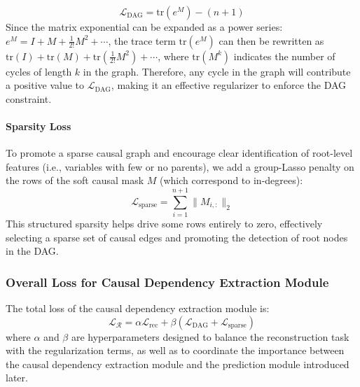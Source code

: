 \documentclass[sigconf, nonacm]{acmart}
\newcommand{\icde}[1]{{\color{black}#1}}
\newcommand{\kdd}[1]{{\color{black}#1}}
\newcommand{\sy}[1]{{\color{black}#1}}
\newcommand{\syne}[1]{{\color{black}#1}}
\begin{document}
\begin{equation}
    \mathcal{L}_{\text{DAG}} = \mathrm{tr}(e^M) - (n+1)
    \label{eq:dag-loss}
\end{equation}
Since the matrix exponential can be expanded as a power series: $e^M = I + M + \frac{1}{2!}M^2 + \cdots$, the trace term $\mathrm{tr}(e^M)$ can then be rewritten as $\mathrm{tr}(I) + \mathrm{tr}(M) + \mathrm{tr}(\frac{1}{2!}M^2) + \cdots$, where $\mathrm{tr}(M^k)$ indicates the number of cycles of length $k$ in the graph. 
Therefore, any cycle in the graph will contribute a positive value to $\mathcal{L}_{\text{DAG}}$, making it an effective regularizer to enforce the DAG constraint.

\paragraph{Sparsity Loss}
To promote a sparse causal graph and encourage clear identification of root-level features (i.e., variables with few or no parents), we add a group-Lasso penalty on the rows of \syne{the soft causal mask $M$} (which correspond to in-degrees):
\begin{equation}
    \mathcal{L}_{\text{sparse}} = \sum_{i=1}^{n+1} \|M_{i, :}\|_2
    \label{eq:sparsity-loss}
\end{equation}
This structured sparsity helps drive some rows entirely to zero, effectively selecting a sparse set of causal edges and promoting the detection of root nodes in the DAG.

\subsubsection{Overall Loss for Causal Dependency Extraction Module}
The total loss of the \sy{causal dependency extraction module} is:
\begin{equation}
    \mathcal{L_{R}} = \alpha\mathcal{L}_{\text{rec}} + \beta(\mathcal{L}_{\text{DAG}} + \mathcal{L}_{\text{sparse}})
    \label{eq:total_reconstruction_loss}
\end{equation}
where $\alpha$ and $\beta$ are hyperparameters designed to balance the reconstruction task with the regularization terms, as well as to coordinate the importance between the \sy{causal dependency extraction module} and the prediction \kdd{module} introduced later.
\end{document}
